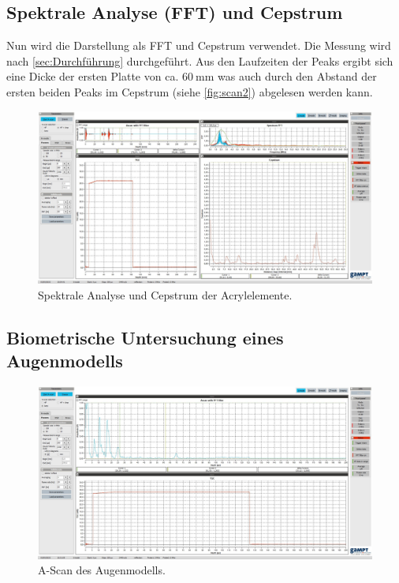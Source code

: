 \subsection{Spektrale Analyse (FFT) und Cepstrum}
\label{subsec:FFT}
Nun wird die Darstellung als FFT und Cepstrum verwendet. 
Die Messung wird nach \autoref{sec:Durchführung} durchgeführt.
Aus den Laufzeiten der Peaks ergibt sich eine Dicke der ersten Platte von ca. $\qty{60}{\milli\meter}$ was auch durch den Abstand der ersten beiden
Peaks im Cepstrum (siehe \autoref{fig:scan2}) abgelesen werden kann.
\begin{figure}[H]
  \centering
  \includegraphics[width=\textwidth]{build/scan4cep.jpg}
  \caption {Spektrale Analyse und Cepstrum der Acrylelemente.}
  \label{fig:scan2}
\end{figure}

\subsection{Biometrische Untersuchung eines Augenmodells}
\label{subsec:Augew}

\begin{figure}[H]
  \centering
  \includegraphics[width=\textwidth]{build/auge.jpg}
  \caption {A-Scan des Augenmodells.}
  \label{fig:auge}
\end{figure}

